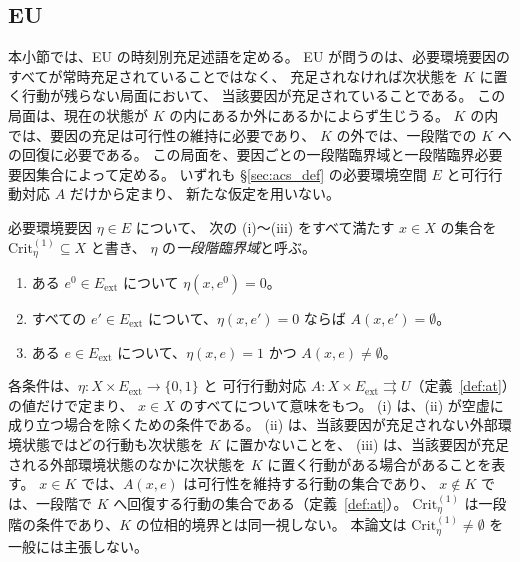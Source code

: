 \subsection{EU}
\label{subsec:eu}

本小節では、EU の時刻別充足述語を定める。
EU が問うのは、必要環境要因のすべてが常時充足されていることではなく、
充足されなければ次状態を $K$ に置く行動が残らない局面において、
当該要因が充足されていることである。
この局面は、現在の状態が $K$ の内にあるか外にあるかによらず生じうる。
$K$ の内では、要因の充足は可行性の維持に必要であり、
$K$ の外では、一段階での $K$ への回復に必要である。
この局面を、要因ごとの一段階臨界域と一段階臨界必要要因集合によって定める。
いずれも \S\ref{sec:acs_def} の必要環境空間 $E$ と可行行動対応 $A$ だけから定まり、
新たな仮定を用いない。

\begin{definition}
\label{def:eu_critical_domain}
必要環境要因 $\eta\in E$ について、
次の (i)〜(iii) をすべて満たす $x\in X$ の集合を $\mathrm{Crit}^{(1)}_\eta\subseteq X$ と書き、
$\eta$ の\emph{一段階臨界域}と呼ぶ。
\begin{enumerate}[label=(\roman*)]
  \item ある $e^0\in E_{\mathrm{ext}}$ について $\eta(x,e^0)=0$。
  \item すべての $e'\in E_{\mathrm{ext}}$ について、$\eta(x,e')=0$ ならば $A(x,e')=\emptyset$。
  \item ある $e\in E_{\mathrm{ext}}$ について、$\eta(x,e)=1$ かつ $A(x,e)\neq\emptyset$。
\end{enumerate}
\end{definition}

各条件は、$\eta:X\times E_{\mathrm{ext}}\to\{0,1\}$ と
可行行動対応 $A:X\times E_{\mathrm{ext}}\rightrightarrows U$（定義~\ref{def:at}）の値だけで定まり、
$x\in X$ のすべてについて意味をもつ。
(i) は、(ii) が空虚に成り立つ場合を除くための条件である。
(ii) は、当該要因が充足されない外部環境状態ではどの行動も次状態を $K$ に置かないことを、
(iii) は、当該要因が充足される外部環境状態のなかに次状態を $K$ に置く行動がある場合があることを表す。
$x\in K$ では、$A(x,e)$ は可行性を維持する行動の集合であり、
$x\notin K$ では、一段階で $K$ へ回復する行動の集合である（定義~\ref{def:at}）。
$\mathrm{Crit}^{(1)}_\eta$ は一段階の条件であり、$K$ の位相的境界とは同一視しない。
本論文は $\mathrm{Crit}^{(1)}_\eta\neq\emptyset$ を一般には主張しない。

